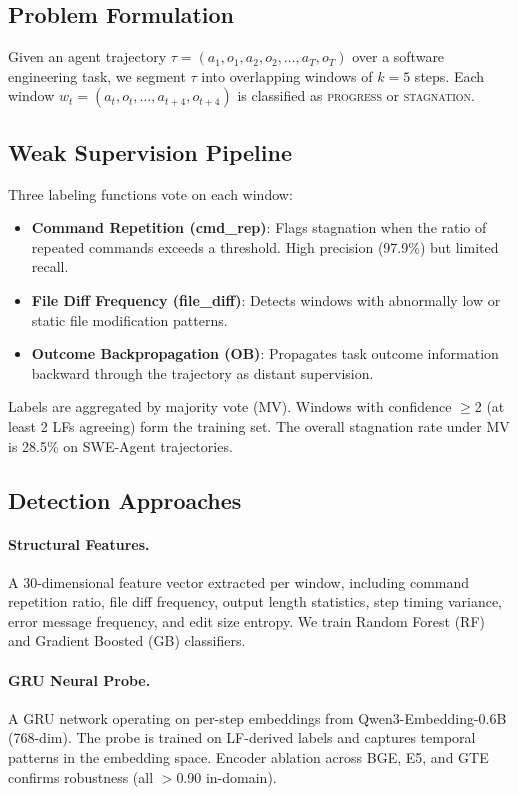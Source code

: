 \documentclass[11pt,a4paper]{article}
\begin{document}
\subsection{Problem Formulation}

Given an agent trajectory $\tau = (a_1, o_1, a_2, o_2, \ldots, a_T, o_T)$ over a software engineering task, we segment $\tau$ into overlapping windows of $k=5$ steps.
Each window $w_t = (a_t, o_t, \ldots, a_{t+4}, o_{t+4})$ is classified as \textsc{progress} or \textsc{stagnation}.

\subsection{Weak Supervision Pipeline}

Three labeling functions vote on each window:

\begin{itemize}[leftmargin=*,nosep]
\item \textbf{Command Repetition (cmd\_rep)}: Flags stagnation when the ratio of repeated commands exceeds a threshold. High precision (97.9\%) but limited recall.
\item \textbf{File Diff Frequency (file\_diff)}: Detects windows with abnormally low or static file modification patterns.
\item \textbf{Outcome Backpropagation (OB)}: Propagates task outcome information backward through the trajectory as distant supervision.
\end{itemize}

Labels are aggregated by majority vote (MV). Windows with confidence $\geq$2 (at least 2 LFs agreeing) form the training set.
The overall stagnation rate under MV is 28.5\% on SWE-Agent trajectories.

\subsection{Detection Approaches}

\paragraph{Structural Features.}
A 30-dimensional feature vector extracted per window, including command repetition ratio, file diff frequency, output length statistics, step timing variance, error message frequency, and edit size entropy.
We train Random Forest (RF) and Gradient Boosted (GB) classifiers.

\paragraph{GRU Neural Probe.}
A GRU network operating on per-step embeddings from Qwen3-Embedding-0.6B (768-dim).
The probe is trained on LF-derived labels and captures temporal patterns in the embedding space.
Encoder ablation across BGE, E5, and GTE confirms robustness (all $>$0.90 in-domain).
\end{document}
